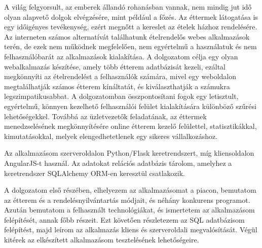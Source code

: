 
A világ felgyorsult, az emberek állandó rohanásban vannak, nem mindig jut idő olyan alapvető dolgok elvégzésére, mint például a főzés. Az éttermek látogatása is egy időigényes tevékenység, ezért megnőtt a kereslet az ételek házhoz rendelésére. Az interneten számos alternatívát találhatunk ételrendelős webes alkalmazások terén, de ezek nem működnek megfelelően, nem egyértelmű a használatuk és nem felhasználóbarát az alkalmazások kialakítása. A dolgozatom célja egy olyan webalkalmazás készítése, amely több étterem adatbázisát kezeli, ezáltal megkönnyíti az ételrendelést a felhasználók számára, mivel egy weboldalon megtalálhatják számos étterem kínáltatát, és kiválaszthatják a számukra legszimpatikusabbat. A dolgozatomban összpontosítani fogok egy letisztult, egyértelmű, könnyen kezelhető felhasználói felület kialakítására különböző szűrési lehetőségekkel. Továbbá az üzletvezetők feladatának, az éttermek menedzselésének megkönnyítésére online étterem kezelő felülettel, statisztikákkal, kimutatásokkal, melyek elengedhetetlenek egy sikeres vállalkozáshoz.

Az alkalmazásom szerveroldalon Python/Flask keretrendszert, míg kliensoldalon AngularJS-t használ. Az adatokat relációs adatbázis tárolom, amelyhez a keretrendszer SQLAlchemy ORM-en keresztül csatlakozik.

A dolgozatom első részében, elhelyezem az alkalmazásomat a piacon, bemutatom az étterem és a rendelésnyilvántartás módjait, és néhány konkurens programot. Azután bemutatom a felhasznált technológiákat, és ismertetem az alkalmazásom felépítését, annak főbb részeit. Ezt követően részletezem az SQL adatbázisom felépítést, majd leírom az alkalmazás kliens és szerveroldali megvalósítását. Végül kitérek az elkészített alkalmazásom tesztelésének lehetőségeire.
